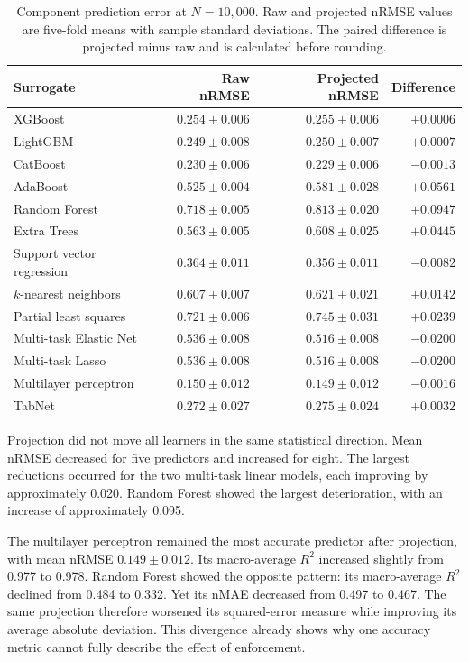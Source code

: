 \begin{table}[htbp]
\centering\small
\caption{Component prediction error at $N=10{,}000$. Raw and projected nRMSE values are five-fold means with sample standard deviations. The paired difference is projected minus raw and is calculated before rounding.}
\label{tab:projection_prediction_results}
\begin{tabular}{p{4.7cm}rrr}
\toprule
Surrogate & Raw nRMSE & Projected nRMSE & Difference\\
\midrule
XGBoost & $0.254\pm0.006$ & $0.255\pm0.006$ & $+0.0006$\\
LightGBM & $0.249\pm0.008$ & $0.250\pm0.007$ & $+0.0007$\\
CatBoost & $0.230\pm0.006$ & $0.229\pm0.006$ & $-0.0013$\\
AdaBoost & $0.525\pm0.004$ & $0.581\pm0.028$ & $+0.0561$\\
Random Forest & $0.718\pm0.005$ & $0.813\pm0.020$ & $+0.0947$\\
Extra Trees & $0.563\pm0.005$ & $0.608\pm0.025$ & $+0.0445$\\
Support vector regression & $0.364\pm0.011$ & $0.356\pm0.011$ & $-0.0082$\\
$k$-nearest neighbors & $0.607\pm0.007$ & $0.621\pm0.021$ & $+0.0142$\\
Partial least squares & $0.721\pm0.006$ & $0.745\pm0.031$ & $+0.0239$\\
Multi-task Elastic Net & $0.536\pm0.008$ & $0.516\pm0.008$ & $-0.0200$\\
Multi-task Lasso & $0.536\pm0.008$ & $0.516\pm0.008$ & $-0.0200$\\
Multilayer perceptron & $0.150\pm0.012$ & $0.149\pm0.012$ & $-0.0016$\\
TabNet & $0.272\pm0.027$ & $0.275\pm0.024$ & $+0.0032$\\
\bottomrule
\end{tabular}
\end{table}

Projection did not move all learners in the same statistical direction. Mean nRMSE decreased for five predictors and increased for eight. The largest reductions occurred for the two multi-task linear models, each improving by approximately 0.020. Random Forest showed the largest deterioration, with an increase of approximately 0.095.

The multilayer perceptron remained the most accurate predictor after projection, with mean nRMSE
$0.149\pm0.012$.
Its macro-average $R^2$ increased slightly from 0.977 to 0.978. Random Forest showed the opposite pattern: its macro-average $R^2$ declined from 0.484 to 0.332. Yet its nMAE decreased from 0.497 to 0.467. The same projection therefore worsened its squared-error measure while improving its average absolute deviation. This divergence already shows why one accuracy metric cannot fully describe the effect of enforcement.

